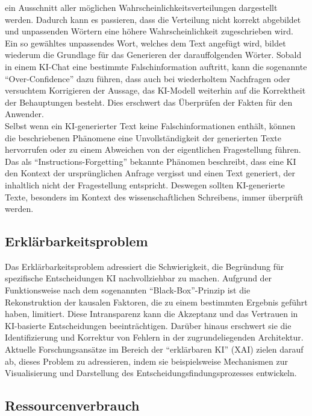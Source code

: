 \documentclass[../main.tex]{subfiles}
\begin{document}
ein Ausschnitt aller möglichen Wahrscheinlichkeitsverteilungen dargestellt werden. Dadurch kann es passieren, dass die Verteilung nicht korrekt abgebildet und 
unpassenden Wörtern eine höhere Wahrscheinlichkeit zugeschrieben wird.\cite{softmax} \\
Ein so gewähltes unpassendes Wort, welches dem Text angefügt wird, bildet wiederum die Grundlage für das Generieren der darauffolgenden Wörter. Sobald in einem KI-Chat eine 
bestimmte Falschinformation auftritt, kann die sogenannte "`Over-Confidence"' dazu führen, dass auch bei wiederholtem Nachfragen oder versuchtem Korrigieren der 
Aussage, das KI-Modell weiterhin auf die Korrektheit der Behauptungen besteht. Dies erschwert das Überprüfen der Fakten für den Anwender.\cite{allgemHalluzinationen,softmax} \\
Selbst wenn ein KI-generierter Text keine Falschinformationen enthält, können die beschriebenen Phänomene eine Unvollständigkeit der generierten Texte hervorrufen 
oder zu einem Abweichen von der eigentlichen Fragestellung führen.  Das als "`Instructions-Forgetting"' bekannte Phänomen beschreibt, dass eine KI den Kontext der 
ursprünglichen Anfrage vergisst und einen Text generiert, der inhaltlich nicht der Fragestellung entspricht. Deswegen sollten KI-generierte Texte, besonders im Kontext 
des wissenschaftlichen Schreibens, immer überprüft werden.\cite{allgemHalluzinationen}


\subsection{Erklärbarkeitsproblem}

Das Erklärbarkeitsproblem adressiert die Schwierigkeit, die Begründung für spezifische Entscheidungen KI nachvollziehbar zu machen. Aufgrund der Funktionsweise nach dem sogenannten 
"`Black-Box"'-Prinzip ist die Rekonstruktion der kausalen Faktoren, die zu einem bestimmten Ergebnis geführt haben, limitiert. Diese Intransparenz kann die Akzeptanz und das Vertrauen in 
KI-basierte Entscheidungen beeinträchtigen. Darüber hinaus erschwert sie die Identifizierung und Korrektur von Fehlern in der zugrundeliegenden Architektur. Aktuelle Forschungsansätze 
im Bereich der "`erklärbaren KI"' (XAI) zielen darauf ab, dieses Problem zu adressieren, indem sie beispielsweise Mechanismen zur Visualisierung und Darstellung des 
Entscheidungsfindungsprozesses entwickeln.
 

\subsection{Ressourcenverbrauch}
\end{document}
